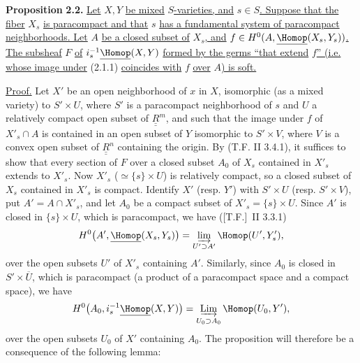 \textbf{Proposition} \textbf{2.2.} \uline{Let} $X,Y$ \uline{be mixed} $S$\uline{-varieties, and} $s\in S$\uline{. Suppose that the fiber} $X_s$ \uline{is paracompact and that} $s$ \uline{has a fundamental system of paracompact neighborhoods. Let} $A$ \uline{be a closed subset of} $X_s$\uline{, and} $f\in H^0(A,\underline{\Homop}(X_s,Y_s))$\uline{.
The subsheaf} $F$ \uline{of} $i_s^{-1}\underline{\Homop}(X,Y)$ \uline{formed by the germs \textquotedblleft that extend} $f$\uline{\textquotedblright{} (i.e. whose image under} (2.1.1) \uline{coincides with} $f$ \uline{over} $A$\uline{) is soft.}

\uline{Proof.} Let $X'$ be an open neighborhood of $x$ in $X$, isomorphic (as a mixed variety) to $S'\times U$, where $S'$ is a paracompact neighborhood of $s$ and $U$ a relatively compact open subset of $\underline{\underline{R}}^m$, and such that the image under $f$ of $X'_s\cap A$ is contained in an open subset of $Y$ isomorphic to $S'\times V$, where $V$ is a convex open subset of $\underline{\underline{R}}^n$ containing the origin. By (T.F. II 3.4.1), it suffices to show that every section of $F$ over a closed subset $A_0$ of $X_s$ contained in $X'_s$ extends to $X'_s$. Now $X'_s$ ($\simeq\{s\}\times U$) is relatively compact, so a closed subset of $X_s$ contained in $X'_s$ is compact. Identify $X'$ (resp. $Y'$) with $S'\times U$ (resp. $S'\times V$), put $A'=A\cap X'_s$, and let $A_0$ be a compact subset of $X'_s=\{s\}\times U$. Since $A'$ is closed in $\{s\}\times U$, which is paracompact, we have ([T.F.]~II 3.3.1)
\[
  H^0\bigl(A',\underline{\Homop}(X_s,Y_s)\bigr)
  =\varinjlim_{U'\supset A'}\Homop(U',Y'_s),
\]
over the open subsets $U'$ of $X'_s$ containing $A'$. Similarly, since $A_0$ is closed in $S'\times \overline U$, which is paracompact (a product of a paracompact space and a compact space), we have
\[
  H^0\bigl(A_0,i_s^{-1}\underline{\Homop}(X,Y)\bigr)
  =\mathop{\underrightarrow{\mathrm{Lim}}}\limits_{U_0\supset A_0}\Homop(U_0,Y'),
\]
over the open subsets $U_0$ of $X'$ containing $A_0$. The proposition will therefore be a
%
consequence of the following lemma:

